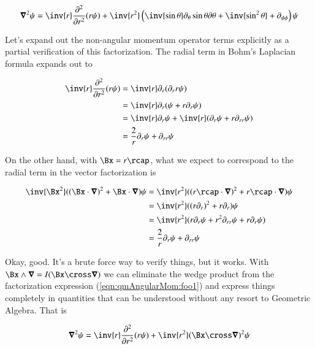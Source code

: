 \begin{align}\label{eqn:qmAngularMom:foo2}
\spacegrad^2 \psi = \inv{r} \frac{\partial^2}{\partial r^2} (r\psi) + \inv{r^2} \left(
\inv{\sin\theta} \partial_\theta \sin\theta \partial\theta + \inv{\sin^2\theta} + \partial_{\phi \phi} \right) \psi
\end{align}

Let's expand out the non-angular momentum operator terms explicitly as a partial verification of this factorization.  The radial term in Bohm's Laplacian formula expands out to

\begin{align*}
\inv{r} \frac{\partial^2}{\partial r^2} (r\psi) 
&=
\inv{r} \partial_r (\partial_r r \psi) \\
&=
\inv{r} \partial_r (\psi + r\partial_r \psi) \\
&=
\inv{r} \partial_r \psi + \inv{r}( \partial_r \psi + r \partial_{rr} \psi) \\
&=
\frac{2}{r} \partial_r \psi + \partial_{rr} \psi \\
\end{align*}

On the other hand, with $\Bx = r\rcap$, what we expect to correspond to the radial term in the vector factorization is

\begin{align*}
\inv{\Bx^2}( (\Bx \cdot \spacegrad)^2 + \Bx \cdot \spacegrad ) \psi
&=
\inv{r^2}( (r \rcap \cdot \spacegrad)^2 + r \rcap \cdot \spacegrad  ) \psi \\
&=
\inv{r^2}( (r \partial_r )^2 + r \partial_r  ) \psi \\
&=
\inv{r^2}( r \partial_r \psi + r^2 \partial_{rr} \psi + r \partial_r \psi ) \\
&=
\frac{2}{r} \partial_r \psi + \partial_{rr} \psi 
\end{align*}

Okay, good.  It's a brute force way to verify things, but it works.  With $\Bx \wedge \spacegrad = I (\Bx \cross \spacegrad)$ we can eliminate the wedge product from the factorization expression (\ref{eqn:qmAngularMom:foo1}) and express things completely in quantities that can be understood without any resort to Geometric Algebra.  That is

\begin{align}\label{eqn:qmAngularMom:foo3}
\spacegrad^2 \psi = \inv{r} \frac{\partial^2}{\partial r^2} (r\psi) + \inv{r^2} (\Bx \cross \spacegrad)^2 \psi
\end{align}

